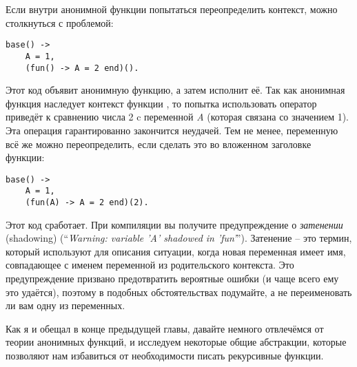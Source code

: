 Если внутри анонимной функции попытаться переопределить контекст, можно столкнуться с проблемой:
\begin{lstlisting}[style=erlang]
base() ->
    A = 1,
    (fun() -> A = 2 end)().
\end{lstlisting}

Этот код объявит анонимную функцию, а затем исполнит её. Так как анонимная функция наследует контекст функции , то попытка использовать оператор \ops{=\strut} приведёт к сравнению числа 2 c переменной \emph{A} (которая связана со значением 1). Эта операция гарантированно закончится неудачей. Тем не менее, переменную всё же можно переопределить, если сделать это во вложенном заголовке функции:
\begin{lstlisting}[style=erlang]
base() ->
    A = 1,
    (fun(A) -> A = 2 end)(2).
\end{lstlisting}

Этот код сработает. При компиляции вы получите предупреждение о \emph{затенении} (shadowing) (``\emph{Warning: variable 'A' shadowed in 'fun'}''). Затенение \--- это термин, который используют для описания ситуации, когда новая переменная имеет имя, совпадающее с именем переменной из родительского контекста. Это предупреждение призвано предотвратить вероятные ошибки (и чаще всего ему это удаётся), поэтому в подобных обстоятельствах подумайте, а не переименовать ли вам одну из переменных.

Как я и обещал в конце предыдущей главы, давайте немного отвлечёмся от теории анонимных функций, и исследуем некоторые общие абстракции, которые позволяют нам избавиться от необходимости писать рекурсивные функции.
